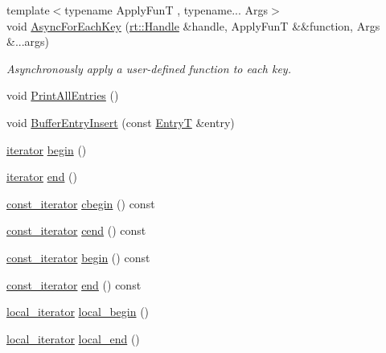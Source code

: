 \begin{DoxyCompactItemize}
{\footnotesize template$<$typename Apply\-Fun\-T , typename... Args$>$ }\\void \hyperlink{classshad_1_1Hashmap_acd1166f6dd5ad1f9f3748ea45b596860}{Async\-For\-Each\-Key} (\hyperlink{classshad_1_1rt_1_1Handle}{rt\-::\-Handle} \&handle, Apply\-Fun\-T \&\&function, Args \&...args)
\begin{DoxyCompactList}\small\item\em Asynchronously apply a user-\/defined function to each key. \end{DoxyCompactList}\item 
void \hyperlink{classshad_1_1Hashmap_aee2b37787d771a453bfe49a85e352e3e}{Print\-All\-Entries} ()
\item 
void \hyperlink{classshad_1_1Hashmap_a313c1401e0dd0cc51cfc750a740f3772}{Buffer\-Entry\-Insert} (const \hyperlink{structshad_1_1Hashmap_1_1EntryT}{Entry\-T} \&entry)
\item 
\hyperlink{classshad_1_1Hashmap_a2500b369fd011d6a9d5e98ff213c9c66}{iterator} \hyperlink{classshad_1_1Hashmap_a8f4a24ff42fd6f6c3394a352169bccb9}{begin} ()
\item 
\hyperlink{classshad_1_1Hashmap_a2500b369fd011d6a9d5e98ff213c9c66}{iterator} \hyperlink{classshad_1_1Hashmap_a72709bee83695661dbd0a43699cd1833}{end} ()
\item 
\hyperlink{classshad_1_1Hashmap_a1f8a379c42bc2d4b67dcc9f519dc537e}{const\-\_\-iterator} \hyperlink{classshad_1_1Hashmap_a1a5209eaa6ee08a67f6bd1bfa97e7419}{cbegin} () const 
\item 
\hyperlink{classshad_1_1Hashmap_a1f8a379c42bc2d4b67dcc9f519dc537e}{const\-\_\-iterator} \hyperlink{classshad_1_1Hashmap_a6c26c36950a5ed3e4e988f4c992c43f5}{cend} () const 
\item 
\hyperlink{classshad_1_1Hashmap_a1f8a379c42bc2d4b67dcc9f519dc537e}{const\-\_\-iterator} \hyperlink{classshad_1_1Hashmap_a38737ea18bd7f7514377774d791f2cf7}{begin} () const 
\item 
\hyperlink{classshad_1_1Hashmap_a1f8a379c42bc2d4b67dcc9f519dc537e}{const\-\_\-iterator} \hyperlink{classshad_1_1Hashmap_a9e6ecb2d7433942bcbf032365125d57c}{end} () const 
\item 
\hyperlink{classshad_1_1Hashmap_a64f114b7ab44339efad138ec0c72b052}{local\-\_\-iterator} \hyperlink{classshad_1_1Hashmap_a4706991a9277cc89fcd154bf73025183}{local\-\_\-begin} ()
\item 
\hyperlink{classshad_1_1Hashmap_a64f114b7ab44339efad138ec0c72b052}{local\-\_\-iterator} \hyperlink{classshad_1_1Hashmap_a6fff153fc13d2d3c3337ac0dfa594b28}{local\-\_\-end} ()

\end{DoxyCompactItemize}
